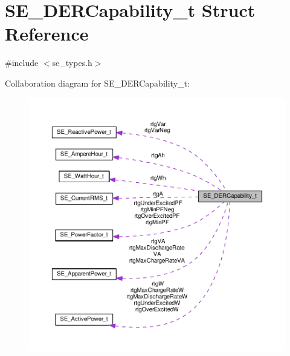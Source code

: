 \hypertarget{structSE__DERCapability__t}{}\section{S\+E\+\_\+\+D\+E\+R\+Capability\+\_\+t Struct Reference}
\label{structSE__DERCapability__t}


{\ttfamily \#include $<$se\+\_\+types.\+h$>$}



Collaboration diagram for S\+E\+\_\+\+D\+E\+R\+Capability\+\_\+t\+:\nopagebreak
\begin{figure}[H]
\begin{center}
\leavevmode
\includegraphics[width=350pt]{structSE__DERCapability__t__coll__graph}
\end{center}
\end{figure}
